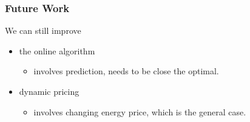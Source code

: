 \documentclass{beamer}
\begin{document}
\begin{frame}
\frametitle{Future Work}
\begin{block}
{We can still improve}
\begin{itemize}
\item
the online algorithm
	\begin{itemize}
	\item
	involves prediction, needs to be close the optimal.
	\end{itemize}
\item
dynamic pricing
	\begin{itemize}
	\item
	involves changing energy price, which is the general case.
	\end{itemize}
\end{itemize}
\end{block}
\end{frame}
\end{document}
